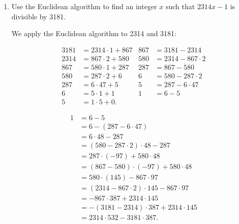\documentclass[12pt]{article}
\begin{document}
{\begin{enumerate}
{\it Proof:} Suppose $a=bq+r$ with $b\ne 0$.  By definition $\gcd(b,r)$ divides both $b$ and $r$.  So let $m,n$ be integers such that $b = m\gcd(b,r)$ and $r=n\gcd(b,r)$.  Then since

\begin{align*}
  a = m\gcd(b,r)q+n\gcd(b,r) = \gcd(b,r)(mq+n)
\end{align*}

we now have that $\gcd (b,r)$ divides $a$.  Since we have already noted that $\gcd(b,r)$ divides $b$, then $\gcd(b,r)$ satisfies the first property of theorem 3.9 applied to $d= gcd(a,b)$.

Next let $c$ be any integer which divides $a$ and $b$.  Let $a = cf$ and $b=cg$.  We want to show that $c$ divides $\gcd(b,r)$, in order to demonstrate the second property of 3.9. Now by theorem 3.10 we have that $\gcd(b,r) = bx+ry$ for some integers $x,y$.  Moreover, since $r=a-bq$ then

\begin{align*}
  \gcd(b,r) = cgx + (a-bq)y = cgx+cf-cgqy = c(gx+f-gqy).
\end{align*}

This shows that $c$ divides $\gcd(b,r)$ as desired.

Hence by theorem 3.9 $\gcd(b,r)= \gcd(a,b)$.

\item Use the Euclidean algorithm to find an integer $x$ such that $2314 x - 1$ is divisible by 3181.

We apply the Euclidean algorithm to 2314 and 3181:

\begin{align*}
  3181 &= 2314\cdot 1 + 867 & 867 &= 3181-2314\\
  2314 &= 867\cdot 2 + 580 & 580 &= 2314-867\cdot 2\\
  867 &= 580\cdot 1 + 287 & 287 &= 867-580\\
  580 &= 287\cdot 2 + 6 & 6 &= 580-287\cdot 2\\
  287 &= 6\cdot 47 + 5 & 5 &= 287 - 6\cdot 47\\
  6 &= 5\cdot 1 + 1 & 1 &= 6-5\\
  5 &= 1\cdot 5 + 0. &
\end{align*}

\begin{align*}
  1 &= 6-5 \\
  &= 6 - (287-6\cdot 47) \\
  &= 6\cdot 48 - 287 \\
  &= (580-287\cdot 2)\cdot 48-287 \\
  &= 287\cdot (-97)+580\cdot 48 \\
  &= (867-580)\cdot(-97)+580\cdot 48 \\
  &= 580\cdot(145)-867\cdot 97 \\
  &= (2314-867\cdot 2)\cdot 145 - 867\cdot 97 \\
  &= -867\cdot 387 + 2314\cdot 145 \\
  &= -(3181-2314)\cdot 387+2314\cdot 145 \\
  &= 2314\cdot 532 - 3181\cdot 387. \\
\end{align*}


\end{enumerate}}
\end{document}
